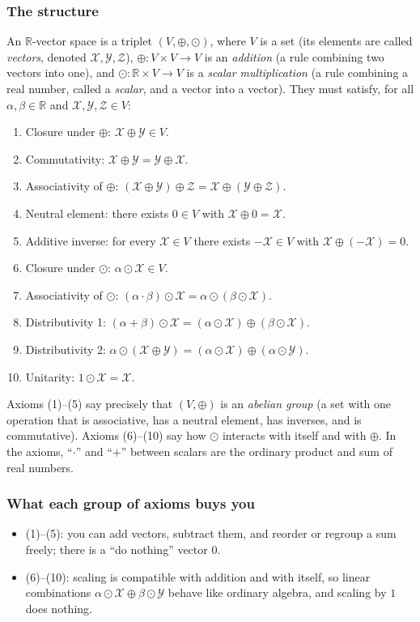 \documentclass[11pt]{article}
\newcommand{\Vsp}{(V, \oplus, \odot)}
\begin{document}
\subsubsection*{The structure}
An $\mathbb R$-vector space is a triplet $\Vsp$, where $V$ is a set (its elements are called \emph{vectors}, denoted $\mathcal X,\mathcal Y,\mathcal Z$), $\oplus:V\times V\to V$ is an \emph{addition} (a rule combining two vectors into one), and $\odot:\mathbb R\times V\to V$ is a \emph{scalar multiplication} (a rule combining a real number, called a \emph{scalar}, and a vector into a vector). They must satisfy, for all $\alpha,\beta\in\mathbb R$ and $\mathcal X,\mathcal Y,\mathcal Z\in V$:
\begin{enumerate}[label=(\arabic*)]
  \item Closure under $\oplus$: $\mathcal X\oplus\mathcal Y\in V$.
  \item Commutativity: $\mathcal X\oplus\mathcal Y=\mathcal Y\oplus\mathcal X$.
  \item Associativity of $\oplus$: $(\mathcal X\oplus\mathcal Y)\oplus\mathcal Z=\mathcal X\oplus(\mathcal Y\oplus\mathcal Z)$.
  \item Neutral element: there exists $0\in V$ with $\mathcal X\oplus 0=\mathcal X$.
  \item Additive inverse: for every $\mathcal X\in V$ there exists $-\mathcal X\in V$ with $\mathcal X\oplus(-\mathcal X)=0$.
  \item Closure under $\odot$: $\alpha\odot\mathcal X\in V$.
  \item Associativity of $\odot$: $(\alpha\cdot\beta)\odot\mathcal X=\alpha\odot(\beta\odot\mathcal X)$.
  \item Distributivity 1: $(\alpha+\beta)\odot\mathcal X=(\alpha\odot\mathcal X)\oplus(\beta\odot\mathcal X)$.
  \item Distributivity 2: $\alpha\odot(\mathcal X\oplus\mathcal Y)=(\alpha\odot\mathcal X)\oplus(\alpha\odot\mathcal Y)$.
  \item Unitarity: $1\odot\mathcal X=\mathcal X$.
\end{enumerate}
Axioms (1)--(5) say precisely that $(V,\oplus)$ is an \emph{abelian group} (a set with one operation that is associative, has a neutral element, has inverses, and is commutative). Axioms (6)--(10) say how $\odot$ interacts with itself and with $\oplus$. In the axioms, ``$\cdot$'' and ``$+$'' between scalars are the ordinary product and sum of real numbers.

\subsubsection*{What each group of axioms buys you}
\begin{itemize}
  \item (1)--(5): you can add vectors, subtract them, and reorder or regroup a sum freely; there is a ``do nothing'' vector $0$.
  \item (6)--(10): scaling is compatible with addition and with itself, so linear combinations $\alpha\odot\mathcal X\oplus\beta\odot\mathcal Y$ behave like ordinary algebra, and scaling by $1$ does nothing.
\end{itemize}
\end{document}
